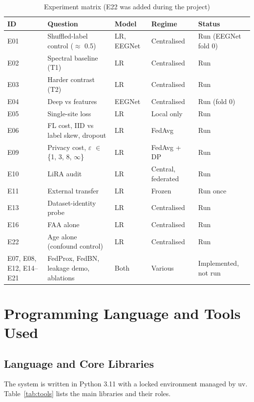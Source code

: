 \documentclass[12pt,a4paper,oneside]{report}
\begin{document}
\begin{table}[!htbp]\centering\small{}
\caption{Experiment matrix (E22 was added during the project)}\label{tab:experiments}
\begin{tabularx}{\textwidth}{lXllX}
\toprule
ID & Question & Model & Regime & Status\\
\midrule
E01 & Shuffled-label control ($\approx$ 0.5) & LR, EEGNet & Centralised & Run (EEGNet fold 0)\\
E02 & Spectral baseline (T1) & LR & Centralised & Run\\
E03 & Harder contrast (T2) & LR & Centralised & Run\\
E04 & Deep vs features & EEGNet & Centralised & Run (fold 0)\\
E05 & Single-site loss & LR & Local only & Run\\
E06 & FL cost, IID vs label skew, dropout & LR & FedAvg & Run\\
E09 & Privacy cost, $\varepsilon$ $\in$ \{1, 3, 8, $\infty$\} & LR & FedAvg + DP & Run\\
E10 & LiRA audit & LR & Central, federated & Run\\
E11 & External transfer & LR & Frozen & Run once\\
E13 & Dataset-identity probe & LR & Centralised & Run\\
E16 & FAA alone & LR & Centralised & Run\\
E22 & Age alone (confound control) & LR & Centralised & Run\\
E07, E08, E12, E14--E21 & FedProx, FedBN, leakage demo, ablations & Both & Various & Implemented, not run\\
\bottomrule
\end{tabularx}
\end{table}

\chapter{Programming Language and Tools Used}

\section{Language and Core Libraries}
The system is written in Python 3.11 with a locked environment managed by uv. Table~\ref{tab:tools} lists the main libraries and their roles.
\end{document}
